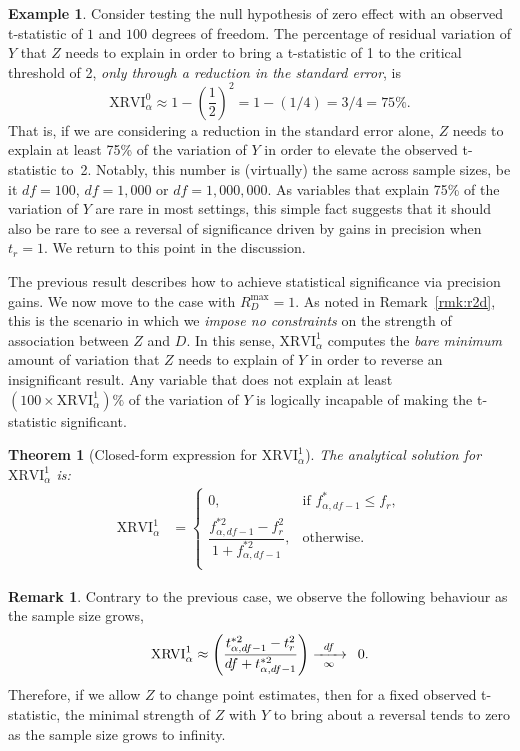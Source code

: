 \documentclass[sts]{imsart}
\theoremstyle{plain}
\newtheorem{theorem}{Theorem}
\theoremstyle{definition}
\newtheorem{remark}{Remark}
\newtheorem{example}{Example}
\newcommand{\df}{df}
\newcommand{\Rdmax}{R^{\max }_{D}}
\newcommand{\fstar}{f^*_{\alpha, \df-1}}
\newcommand{\fstarsq}{f^{* 2}_{\alpha, \df-1}}
\newcommand{\tstarsq}{t^{*2}_{\alpha, \df-1}}
\newcommand{\tobs}{t_{r}}
\newcommand{\XRVI}{\text{XRVI}}
\begin{document}
\begin{example}
     Consider testing the null hypothesis of zero effect with an observed t-statistic of $1$ and $100$ degrees of freedom.  The percentage of residual variation of $Y$ that $Z$ needs to explain in order to bring a t-statistic of 1 to the critical threshold of 2, \emph{only through a reduction in the standard error}, is
    $$
    \XRVI^{0}_{\alpha} \approx 1 - \left(\frac{1}{2}\right)^2 = 1 - (1/4) = 3/4 = 75\%.
    $$
    That is, if we are considering a reduction in the standard error alone, $Z$ needs to explain at least 75\% of the variation of $Y$ in order to elevate the observed t-statistic to~2. Notably, this number 
    is (virtually) the same across sample sizes, be it $\df = 100$, $\df = 1,000$ or $\df=1,000,000$. As variables that explain 75\% of the variation of $Y$ are rare in most settings, this simple fact suggests that it should also be rare to see a reversal of significance driven by gains in precision when $t_r =1$. We return to this point in the discussion.
\end{example}

The previous result describes how to achieve statistical significance via precision gains. We now move to the case with $\Rdmax=1$.  As noted in Remark~\ref{rmk:r2d}, this is the scenario in which we \emph{impose no constraints} on the strength of association between $Z$ and $D$. In this sense, $\XRVI^{1}_{\alpha}$ computes the \emph{bare minimum} amount of variation that $Z$ needs to explain of $Y$ in order to reverse an insignificant result. Any variable that does not explain at least $(100 \times \XRVI^{1}_{\alpha}) \%$ of the variation of $Y$ is logically incapable of making the t-statistic significant. 

\begin{theorem}[Closed-form expression for $\XRVI^{1}_{\alpha}$]
\label{thm:XRVI-1}
    The analytical solution for $\XRVI^{1}_{\alpha}$ is:
    \begin{align*}
        \XRVI^{1}_{\alpha}
        &= 
        \begin{cases}
            0, &\text{if } \fstar \leq f_{r},  \\
            \dfrac{\fstarsq - f_{r} ^2}{1+\fstarsq}, &\text{otherwise.} \\
        \end{cases}
    \end{align*}
\end{theorem}

\begin{remark} 
\label{rmk:xrv1}
Contrary to the previous case, we observe the following behaviour as the sample size grows,
\begin{align*}
    \XRVI^{1}_{\alpha} \approx  \left(\dfrac{\tstarsq-\tobs^2}{\df + \tstarsq}\right)  \xrightarrow[\enskip\infty\enskip]{\df} \enspace 0.
\end{align*}
Therefore, if we allow $Z$ to change point estimates, then for a fixed observed t-statistic, the minimal strength of $Z$ with $Y$ to bring about a reversal tends to zero as the sample size grows to infinity. 
\end{remark}
\end{document}
